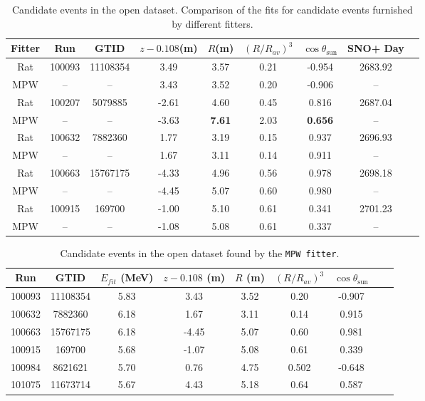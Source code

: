 \begin{table}[ht]
	\centering
	\caption[Candidate events in the open dataset.]{Candidate events in the open dataset. Comparison of the fits for candidate events furnished by different fitters.	\label{tab:opendataCompare}}
	\begin{tabular*}{150mm}{c@{\extracolsep{\fill}}cccccccc}
		\toprule
		Fitter &	Run &  GTID &  $z-0.108$(m) & $R$(m)& $(R/R_{av})^3$ & $\cos\theta_\mathrm{sun}$ & SNO+ Day\\
		\hline 
		Rat & 100093 &11108354 &3.49 &3.57 &0.21 &-0.954 &2683.92 \\	
		MPW &  --& --& 3.43 &	3.52 &	0.20	& -0.906 & --\\
		Rat &	100207 &5079885 &-2.61 &4.60 &0.45 &0.816 &2687.04\\
		MPW &	 --& --& -3.63 & \textbf{7.61} &	2.03 & \textbf{0.656} & -- \\
		Rat &100632 &7882360 &1.77 &3.19 &0.15 &0.937 &2696.93\\
		MPW &    --& --&  1.67 & 3.11 &	0.14 & 0.911 & -- \\
		Rat &100663 &15767175 &-4.33& 4.96 &0.56 &0.978 &2698.18\\
		MPW & --& -- &-4.45 &	5.07 &	0.60 &	0.980 & -- \\
		Rat &100915 &169700 &-1.00 &5.10 &0.61 &0.341 &2701.23\\
		MPW &	--& --& -1.08 &	5.08 &	0.61 &	0.337 & -- \\	
		\bottomrule
	\end{tabular*}
\end{table}

\begin{table}[ht]
	\centering
	\caption{Candidate events in the open dataset found by the \texttt{MPW fitter}.	\label{tab:opendataMPW}}
	\begin{tabular*}{145mm}{c@{\extracolsep{\fill}}cccccccc}
		\toprule
		Run & GTID & $E_{fit}$ (MeV) & $z-0.108$ (m) & $R$ (m)& $(R/R_{av})^3$ & $\cos\theta_\mathrm{sun}$\\
		\hline 
		100093 &	11108354	&5.83 & 3.43 & 3.52 & 0.20 & -0.907\\
		100632&	7882360    &6.18& 1.67 &3.11 &0.14 &0.915\\
		100663&	15767175   &	6.18 & -4.45 &5.07 &0.60&	0.981\\
		100915&	169700   &	5.68 &	-1.07 &5.08 &0.61&0.339\\
		100984&	8621621&	5.70 & 0.76 &4.75 &0.502&-0.648\\
		101075&	11673714&	5.67 &4.43 &5.18 &0.64& 0.587\\
		\bottomrule
	\end{tabular*}
\end{table}

